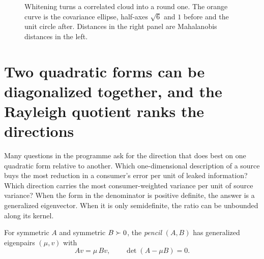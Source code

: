 \begin{figure}[tbp]
\caption{Whitening turns a correlated cloud into a round one. The orange curve is
the covariance ellipse, half-axes $\sqrt6$ and $1$ before and the unit circle
after. Distances in the right panel are Mahalanobis distances in the left.}
\label{fig:ch01:whiten}
\end{figure}



\section{Two quadratic forms can be diagonalized together, and the Rayleigh quotient ranks the directions}\label{sec:ch01:pencil}

Many questions in the programme ask for the direction that does best on one
quadratic form relative to another. Which one-dimensional description of a
source buys the most reduction in a consumer's error per unit of leaked
information? Which direction carries the most consumer-weighted variance per
unit of source variance? When the form in the denominator is positive
definite, the answer is a generalized eigenvector. When it is only
semidefinite, the ratio can be unbounded along its kernel.

\begin{definition}\label{def:ch01:pencil}
For symmetric $A$ and symmetric $B\succ 0$, the \emph{pencil} $(A,B)$ has
generalized eigenpairs $(\mu,v)$ with
\begin{equation}\label{eq:ch01:geneig}
Av=\mu\,Bv,\qquad \det(A-\mu B)=0 .
\end{equation}
\end{definition}


